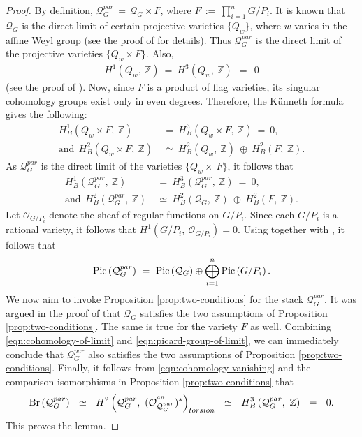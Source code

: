 \documentclass[10pt,reqno]{amsart}
\DeclareMathOperator{\Pic}{\textnormal{Pic}}
\DeclareMathOperator{\Br}{\textnormal{Br}}
\newcommand{\mc}[1]{\mathcal{#1}}
\newcommand{\bb}[1]{\mathbb{#1}}
\theoremstyle{myroman}
\numberwithin{equation}{section}
\begin{document}
		\begin{proof}
			By definition, $\mc{Q}_G^{par} \,=\, \mc{Q}_G\times F$, where $F\,:=\, \prod_{i=1}^{n}G/P_i$. It is known that $\mc{Q}_G$ is the direct limit of certain projective varieties $\{Q_w\}$, where $w$ varies
			in the affine Weyl group (see the proof of \cite[Proposition 3.1]{BH13} for details). Thus $\mc{Q}_G^{par}$ is the direct
			limit of the projective varieties $\{Q_w\times F\}$. Also,
			\begin{align*}
				H^1\left(Q_w,\ \bb{Z}\right)\ =\ H^3\left(Q_w,\ \bb{Z}\right)\ \ =\ \ 0
			\end{align*}
			(see the proof of \cite[Proposition 3.1]{BH13}). Now, since $F$ is a product of flag varieties, its singular
			cohomology groups exist only in even degrees. Therefore, the K\"unneth formula gives the following: 
			\begin{align*}
				H^1_B\left(Q_w\times F,\ \bb{Z}\right)\ &=\ H^3_B\left(Q_w\times F,\ \bb{Z}\right)\ =\ 0,\\
				\text{and}\ \ H^2_B\left(Q_w\times F,\ \bb{Z}\right)\ &\simeq \ H^2_B(Q_w,\ \bb{Z})\ \oplus\ H^2_B(F,\ \bb{Z}).
			\end{align*}
			As $\mc{Q}_G^{par}$ is the direct limit of the varieties
			$\{Q_w\times\ F\}$, it follows that
			\begin{align}\label{eqn:cohomology-vanishing}
				H^1_B\left(\mc{Q}_G^{par}, \ \bb{Z}\right)\ &=\ H^3_B\left(\mc{Q}_G^{par}, \ \bb{Z}\right)\ =\ 0,\\
				\text{and}\ \ H^2_B(\mc{Q}_G^{par}, \ \bb{Z})\ &\simeq\  H^2_B(\mc{Q}_G,\ \bb{Z})\ \oplus\ H^2_B(F,\ \bb{Z})\label{eqn:cohomology-of-limit}.
			\end{align}
			Let $\mc{O}_{G/P_i}$ denote the sheaf of regular functions on $G/P_i$. Since each $G/P_i$ is a rational variety, it follows that $H^1\left(G/P_i,\ \mc{O}_{G/P_i}\right)=0$.  Using  together with \cite[p. 157, Lemma 2.2]{KN97}, it follows that 
			\begin{align}\label{eqn:picard-group-of-limit}
				\Pic\left(\mc{Q}^{par}_G\right)\ =\  \Pic\left(\mc{Q}_G\right)\oplus \bigoplus_{i=1}^{n}\Pic\left(G/P_i\right). 
			\end{align}
			We now aim to invoke Proposition \ref{prop:two-conditions} for the stack $\mc{Q}^{par}_G$. It was argued in the
			proof of \cite[Proposition 3.1]{BH13} that $\mc{Q}_G$ satisfies the two assumptions  of Proposition
			\ref{prop:two-conditions}. The same is true for the variety $F$ as well. Combining \eqref{eqn:cohomology-of-limit}
			and \eqref{eqn:picard-group-of-limit}, we can immediately conclude that $\mc{Q}_G^{par}$ also satisfies the
			two assumptions of Proposition \ref{prop:two-conditions}. Finally, it follows from \eqref{eqn:cohomology-vanishing}
			and the comparison isomorphisms in Proposition \ref{prop:two-conditions} that
			$$\Br\left(\mc{Q}_G^{par}\right)\ \ \simeq\ \ H^2\left(\mc{Q}_G^{par},\ 
			(\mc{O}^{^{an}}_{\mc{Q}^{par}_G})^*\right)_{torsion}\ \ 
			\simeq\ \ H^3_B\left(\mc{Q}^{par}_G,\ \bb{Z}\right)\ \ =\ \ 0.$$ This proves the lemma.
		\end{proof}
		
\end{document}
